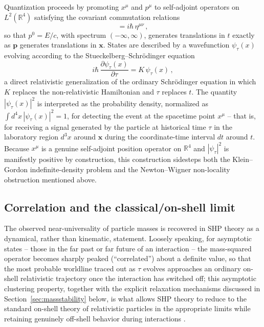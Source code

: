 \documentclass[11pt]{article}
\begin{document}
Quantization proceeds by promoting $x^\mu$ and $p^\mu$ to self-adjoint
operators on $L^2(\mathbb{R}^4)$ satisfying the covariant commutation relations
\begin{equation}
[x^\mu,p^\nu]=i\hbar\,\eta^{\mu\nu}\,,
\label{eq:commutator}
\end{equation}
so that $p^0=E/c$, with spectrum $(-\infty,\infty)$, generates translations in
$t$ exactly as $\bm p$ generates translations in $\bm x$. States are described
by a wavefunction $\psi_\tau(x)$ evolving according to the
Stueckelberg--Schr\"odinger equation
\begin{equation}
i\hbar\,\frac{\partial \psi_\tau(x)}{\partial \tau}=K\,\psi_\tau(x)\,,
\label{eq:stueckschrod}
\end{equation}
a direct relativistic generalization of the ordinary Schr\"odinger equation in
which $K$ replaces the non-relativistic Hamiltonian and $\tau$ replaces $t$.
The quantity $|\psi_\tau(x)|^2$ is interpreted as the probability density,
normalized as $\int d^4x\,|\psi_\tau(x)|^2=1$, for detecting the event at the
spacetime point $x^\mu$ -- that is, for receiving a signal generated by the
particle at historical time $\tau$ in the laboratory region $d^3x$ around
$\bm x$ during the coordinate-time interval $dt$ around $t$. Because $x^\mu$ is
a genuine self-adjoint position operator on $\mathbb{R}^4$ and $|\psi_\tau|^2$
is manifestly positive by construction, this construction sidesteps both the
Klein--Gordon indefinite-density problem and the Newton--Wigner non-locality
obstruction mentioned above.

\subsection{Correlation and the classical/on-shell limit}
\label{sec:correlation}

The observed near-universality of particle masses is recovered in SHP theory
as a dynamical, rather than kinematic, statement. Loosely speaking, for
asymptotic states -- those in the far past or far future of an interaction --
the mass-squared operator becomes sharply peaked (``correlated'') about a
definite value, so that the most probable worldline traced out as $\tau$
evolves approaches an ordinary on-shell relativistic trajectory once the
interaction has switched off; this asymptotic clustering property, together
with the explicit relaxation mechanisms discussed in
Section~\ref{sec:massstability} below, is what allows SHP theory to reduce to
the standard on-shell theory of relativistic particles in the appropriate
limits while retaining genuinely off-shell behavior during interactions
\cite{Horwitz2015,HorwitzPiron1973}.
\end{document}
